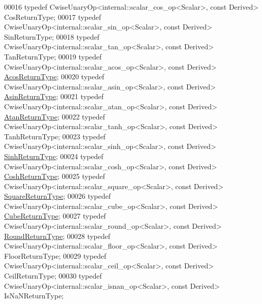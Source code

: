 \begin{DoxyCode}
00016 \textcolor{keyword}{typedef} CwiseUnaryOp<internal::scalar\_cos\_op<Scalar>, \textcolor{keyword}{const} Derived> CosReturnType;
00017 \textcolor{keyword}{typedef} CwiseUnaryOp<internal::scalar\_sin\_op<Scalar>, \textcolor{keyword}{const} Derived> SinReturnType;
00018 \textcolor{keyword}{typedef} CwiseUnaryOp<internal::scalar\_tan\_op<Scalar>, \textcolor{keyword}{const} Derived> TanReturnType;
00019 \textcolor{keyword}{typedef} CwiseUnaryOp<internal::scalar\_acos\_op<Scalar>, \textcolor{keyword}{const} Derived> 
      \hyperlink{group___core___module_class_eigen_1_1_cwise_unary_op}{AcosReturnType};
00020 \textcolor{keyword}{typedef} CwiseUnaryOp<internal::scalar\_asin\_op<Scalar>, \textcolor{keyword}{const} Derived> 
      \hyperlink{group___core___module_class_eigen_1_1_cwise_unary_op}{AsinReturnType};
00021 \textcolor{keyword}{typedef} CwiseUnaryOp<internal::scalar\_atan\_op<Scalar>, \textcolor{keyword}{const} Derived> 
      \hyperlink{group___core___module_class_eigen_1_1_cwise_unary_op}{AtanReturnType};
00022 \textcolor{keyword}{typedef} CwiseUnaryOp<internal::scalar\_tanh\_op<Scalar>, \textcolor{keyword}{const} Derived> TanhReturnType;
00023 \textcolor{keyword}{typedef} CwiseUnaryOp<internal::scalar\_sinh\_op<Scalar>, \textcolor{keyword}{const} Derived> 
      \hyperlink{group___core___module_class_eigen_1_1_cwise_unary_op}{SinhReturnType};
00024 \textcolor{keyword}{typedef} CwiseUnaryOp<internal::scalar\_cosh\_op<Scalar>, \textcolor{keyword}{const} Derived> 
      \hyperlink{group___core___module_class_eigen_1_1_cwise_unary_op}{CoshReturnType};
00025 \textcolor{keyword}{typedef} CwiseUnaryOp<internal::scalar\_square\_op<Scalar>, \textcolor{keyword}{const} Derived> 
      \hyperlink{group___core___module_class_eigen_1_1_cwise_unary_op}{SquareReturnType};
00026 \textcolor{keyword}{typedef} CwiseUnaryOp<internal::scalar\_cube\_op<Scalar>, \textcolor{keyword}{const} Derived> 
      \hyperlink{group___core___module_class_eigen_1_1_cwise_unary_op}{CubeReturnType};
00027 \textcolor{keyword}{typedef} CwiseUnaryOp<internal::scalar\_round\_op<Scalar>, \textcolor{keyword}{const} Derived> 
      \hyperlink{group___core___module_class_eigen_1_1_cwise_unary_op}{RoundReturnType};
00028 \textcolor{keyword}{typedef} CwiseUnaryOp<internal::scalar\_floor\_op<Scalar>, \textcolor{keyword}{const} Derived> FloorReturnType;
00029 \textcolor{keyword}{typedef} CwiseUnaryOp<internal::scalar\_ceil\_op<Scalar>, \textcolor{keyword}{const} Derived> CeilReturnType;
00030 \textcolor{keyword}{typedef} CwiseUnaryOp<internal::scalar\_isnan\_op<Scalar>, \textcolor{keyword}{const} Derived> IsNaNReturnType;

\end{DoxyCode}
